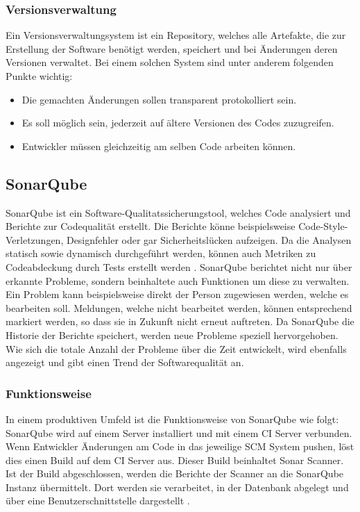 \subsubsection{Versionsverwaltung}
Ein Versionsverwaltungsystem ist ein Repository, welches alle Artefakte, die zur Erstellung der Software benötigt werden, speichert und bei Änderungen deren Versionen verwaltet.
Bei einem solchen System sind unter anderem folgenden Punkte wichtig:
\begin{itemize}
   \item Die gemachten Änderungen sollen transparent protokolliert sein.
   \item Es soll möglich sein, jederzeit auf ältere Versionen des Codes zuzugreifen.
   \item Entwickler müssen gleichzeitig am selben Code arbeiten können.
\end{itemize}



\subsection{SonarQube}\label{quality:sonar}
SonarQube ist ein Software-Qualitatssicherungstool, welches Code analysiert und Berichte zur Codequalität erstellt.
Die Berichte könne beispielsweise Code-Style-Verletzungen, Designfehler oder gar Sicherheitslücken aufzeigen.
Da die Analysen statisch sowie dynamisch durchgeführt werden, können auch Metriken zu Codeabdeckung durch Tests erstellt werden \parencite{malloy_2021}.
SonarQube berichtet nicht nur über erkannte Probleme, sondern beinhaltete auch Funktionen um diese zu verwalten.
Ein Problem kann beispielsweise direkt der Person zugewiesen werden, welche es bearbeiten soll.
Meldungen, welche nicht bearbeitet werden, können entsprechend markiert werden, so dass sie in Zukunft nicht erneut auftreten.
Da SonarQube die Historie der Berichte speichert, werden neue Probleme speziell hervorgehoben.
Wie sich die totale Anzahl der Probleme über die Zeit entwickelt, wird ebenfalls angezeigt und gibt einen Trend der Softwarequalität an.


\subsubsection{Funktionsweise}\label{sonar:funktionsweise}
In einem produktiven Umfeld ist die Funktionsweise von SonarQube wie folgt:
SonarQube wird auf einem Server installiert und mit einem \ac{CI} Server verbunden.
Wenn Entwickler Änderungen am Code in das jeweilige \ac{SCM} System pushen, löst dies einen Build auf dem \ac{CI} Server aus.
Dieser Build beinhaltet Sonar Scanner.
Ist der Build abgeschlossen, werden die Berichte der Scanner an die SonarQube Instanz übermittelt.
Dort werden sie verarbeitet, in der Datenbank abgelegt und über eine Benutzerschnittstelle dargestellt \parencite{malloy_2021}.


